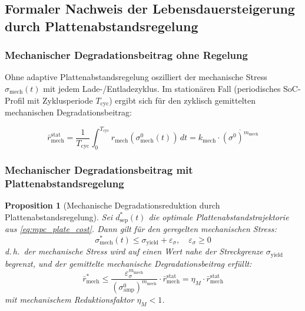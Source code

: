 ﻿\documentclass[12pt,a4paper]{article}
\newtheorem{proposition}[theorem]{Proposition}
\begin{document}
\subsection{Formaler Nachweis der Lebensdauersteigerung durch Plattenabstandsregelung}

\subsubsection{Mechanischer Degradationsbeitrag ohne Regelung}

Ohne adaptive Plattenabstandsregelung oszilliert der mechanische Stress
$\sigma_\mathrm{mech}(t)$ mit jedem Lade-/Entladezyklus. Im stationären
Fall (periodisches SoC-Profil mit Zyklusperiode $T_\mathrm{cyc}$) ergibt sich
für den zyklisch gemittelten mechanischen Degradationsbeitrag:

\begin{equation}
	\bar{r}_\mathrm{mech}^\mathrm{stat} = \frac{1}{T_\mathrm{cyc}}
	\int_0^{T_\mathrm{cyc}} r_\mathrm{mech}(\sigma_\mathrm{mech}^0(t))\, dt
	= k_\mathrm{mech} \cdot \overline{(\sigma^0)^{m_\mathrm{mech}}}
	\label{eq:mech_deg_static}
\end{equation}

\subsubsection{Mechanischer Degradationsbeitrag mit Plattenabstandsregelung}

\begin{proposition}[Mechanische Degradationsreduktion durch Plattenabstandsregelung]
	\label{prop:plate_deg}
	Sei $d_\mathrm{sep}^*(t)$ die optimale Plattenabstandstrajektorie aus
	\eqref{eq:mpc_plate_cost}. Dann gilt für den geregelten mechanischen Stress:
	\begin{equation}
		\sigma_\mathrm{mech}^*(t) \leq \sigma_\mathrm{yield} + \varepsilon_\sigma,
		\quad \varepsilon_\sigma \geq 0
	\end{equation}
	d.\,h.\ der mechanische Stress wird auf einen Wert nahe der Streckgrenze
	$\sigma_\mathrm{yield}$ begrenzt, und der gemittelte mechanische
	Degradationsbeitrag erfüllt:
	\begin{equation}
		\bar{r}_\mathrm{mech}^* \leq \frac{\varepsilon_\sigma^{m_\mathrm{mech}}}
		{(\sigma_\mathrm{amp}^0)^{m_\mathrm{mech}}} \cdot \bar{r}_\mathrm{mech}^\mathrm{stat}
		= \eta_M \cdot \bar{r}_\mathrm{mech}^\mathrm{stat}
		\label{eq:mech_deg_controlled}
	\end{equation}
	mit mechanischem Reduktionsfaktor $\eta_M < 1$.
\end{proposition}
\end{document}
